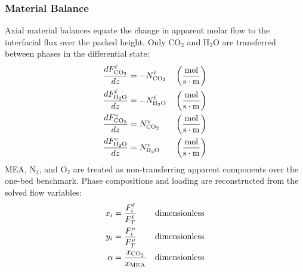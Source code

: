             \subsubsection{Material Balance}\label{subsubsec:material-balance}
                Axial material balances equate the change in apparent molar flow to the interfacial flux over the packed height. Only CO$_2$ and H$_2$O are transferred between phases in the differential state:
                \begin{align}
                    \frac{d F^{\liq}_{ \COtwo}}{d z} &= -N^{\liq}_{ \COtwo} && \left(\frac{\unit{mol}}{\unit{s\cdot m}} \right)\\
                    \frac{d F^{\liq}_{ \HtwoO}}{d z} &= -N^{\liq}_{ \HtwoO} && \left(\frac{\unit{mol}}{\unit{s\cdot m}} \right)\\
                    \frac{d F^{\vap}_{ \COtwo}}{d z} &= N^{\vap}_{ \COtwo} && \left(\frac{\unit{mol}}{\unit{s\cdot m}} \right)\\
                    \frac{d F^{\vap}_{ \HtwoO}}{d z} &= N^{\vap}_{ \HtwoO} && \left(\frac{\unit{mol}}{\unit{s\cdot m}} \right)
                \end{align}
                MEA, N$_2$, and O$_2$ are treated as non-transferring apparent components over the one-bed benchmark. Phase compositions and loading are reconstructed from the solved flow variables:
                \begin{align}
                    x_i &= \frac{F^{\liq}_{ i}}{F^{\liq}_{ T}}
                    && \text{dimensionless}\\
                    y_i &= \frac{F^{\vap}_{ i}}{F^{\vap}_{ T}}
                    && \text{dimensionless}\\
                    \alpha &= \frac{x_{\COtwo}}{x_{\MEA}}
                    && \text{dimensionless}
                \end{align}


